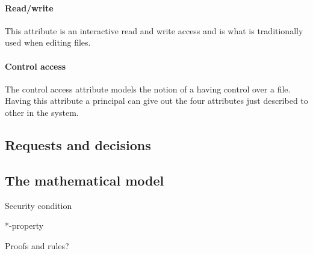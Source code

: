 \paragraph{Read/write}
This attribute is an interactive read and write access and is what is traditionally used when editing files.

\paragraph{Control access}
The control access attribute models the notion of a \principal{} having control over a file.
Having this attribute a principal{} can give out the four attributes just described to other \principals{} in the system.

\subsection{Requests and decisions}

\subsection{The mathematical model}

Security condition

*-property

Proofs and rules?

